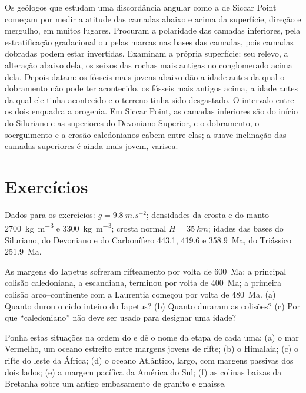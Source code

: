 \begin{inthefield}
Os geólogos que estudam uma discordância angular como a de Siccar Point começam por medir a
atitude das camadas abaixo e acima da superfície, direção e mergulho, em muitos lugares. Procuram
a polaridade das camadas inferiores, pela estratificação gradacional ou pelas marcas nas bases das camadas,
pois camadas dobradas podem estar invertidas. Examinam a própria superfície: seu relevo, a
alteração abaixo dela, os seixos das rochas mais antigas no conglomerado acima dela. Depois
datam: os fósseis mais jovens abaixo dão a idade antes da qual o dobramento não pode ter acontecido,
os fósseis mais antigos acima, a idade antes da qual ele tinha acontecido e o terreno tinha sido
desgastado. O intervalo entre os dois enquadra a orogenia. Em Siccar Point, as camadas inferiores são do início do
Siluriano e as superiores do Devoniano Superior, e o dobramento, o soerguimento e a erosão caledonianos cabem
entre elas; a suave inclinação das camadas superiores é ainda mais jovem, varisca.
\end{inthefield}

\section*{Exercícios}\label{sec:b2:wilson-cycle:exercises}

Dados para os exercícios: $g = \qty{9.8}{m.s^{-2}}$; densidades da crosta e do manto
\qty{2700}{kg.m^{-3}} e \qty{3300}{kg.m^{-3}}; crosta normal $H = \qty{35}{km}$; idades das
bases do Siluriano, do Devoniano e do Carbonífero 443.1, 419.6 e \qty{358.9}{Ma}, do
Triássico \qty{251.9}{Ma}.

\begin{exercise}[$\star$]\label{exo:b2:wilson-cycle:1}
As margens do Iapetus sofreram rifteamento por volta de \qty{600}{Ma}; a principal colisão caledoniana, a
escandiana, terminou por volta de \qty{400}{Ma}; a primeira colisão arco--continente com a Laurentia começou
por volta de \qty{480}{Ma}. (a) Quanto durou o ciclo inteiro do Iapetus? (b) Quanto duraram as
colisões? (c) Por que ``caledoniano'' não deve ser usado para designar uma idade?
\end{exercise}

\begin{exercise}[$\star$]\label{exo:b2:wilson-cycle:2}
Ponha estas situações na ordem do  e dê o nome da etapa de cada uma: (a) o
mar Vermelho, um oceano estreito entre margens jovens de rifte; (b) o Himalaia; (c) o rifte do
leste da África; (d) o oceano Atlântico, largo, com margens passivas dos dois lados; (e) a margem pacífica
da América do Sul; (f) as colinas baixas da Bretanha sobre um antigo embasamento de granito e gnaisse.
\end{exercise}

